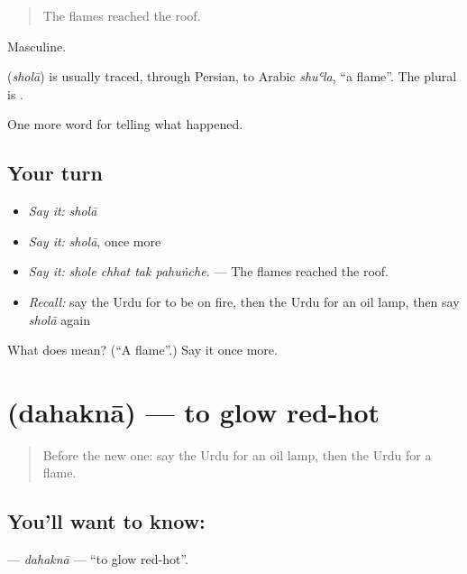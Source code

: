 \begin{quote}
The flames reached the roof.
\end{quote}

Masculine.

\begin{cousinweb}
\textbf{} (\emph{sholā}) is usually traced, through Persian, to Arabic \emph{shuʿla}, \textquotedblleft{}a flame\textquotedblright{}. The plural is \textbf{}.
\end{cousinweb}

\begin{grammarlens}[title={What you've built}]
One more word for telling what happened.
\end{grammarlens}

\subsection*{Your turn}
\begin{itemize}
\raggedright
  \item \emph{Say it:} \emph{sholā}
  \item \emph{Say it:} \emph{sholā}, once more
  \item \emph{Say it:} \emph{shole chhat tak pahuṅche.} — The flames reached the roof.
  \item \emph{Recall:} say the Urdu for to be on fire, then the Urdu for an oil lamp, then say \emph{sholā} again
\end{itemize}

\begin{tcolorbox}[breakable,colback=teal!4,colframe=teal!35!black,title={Before you move on}]
What does  mean? (\textquotedblleft{}A flame\textquotedblright{}.) Say it once more.
\end{tcolorbox}
\section[\texorpdfstring{\ur{دہکنا} (dahaknā)}{دہکنا (dahaknā)}]{ (dahaknā) — to glow red-hot}

\label{lesson:UR-C288-dahakna}



\begin{quote}
Before the new one: say the Urdu for an oil lamp, then the Urdu for a flame.
\end{quote}

\subsection*{You'll want to know: }
\textbf{} — \emph{dahaknā} — \textquotedblleft{}to glow red-hot\textquotedblright{}.

